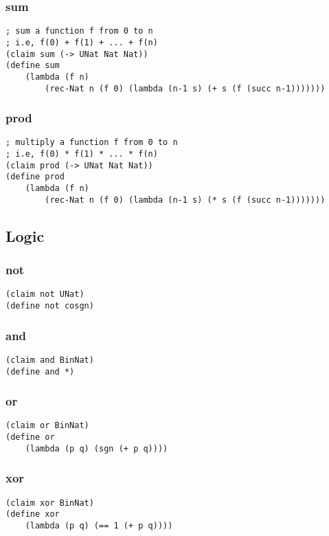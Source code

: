 \subsubsection{sum} \label{code:sum}
\begin{verbatim}
; sum a function f from 0 to n
; i.e, f(0) + f(1) + ... + f(n)
(claim sum (-> UNat Nat Nat))
(define sum
    (lambda (f n)
        (rec-Nat n (f 0) (lambda (n-1 s) (+ s (f (succ n-1)))))))
\end{verbatim}

\subsubsection{prod} \label{code:prod}
\begin{verbatim}
; multiply a function f from 0 to n
; i.e, f(0) * f(1) * ... * f(n)
(claim prod (-> UNat Nat Nat))
(define prod
    (lambda (f n)
        (rec-Nat n (f 0) (lambda (n-1 s) (* s (f (succ n-1)))))))
\end{verbatim}


\subsection{Logic}

\subsubsection{not} \label{code:not}
\begin{verbatim}
(claim not UNat)
(define not cosgn)
\end{verbatim}

\subsubsection{and} \label{code:and}
\begin{verbatim}
(claim and BinNat)
(define and *)
\end{verbatim}

\subsubsection{or} \label{code:or}
\begin{verbatim}
(claim or BinNat)
(define or
    (lambda (p q) (sgn (+ p q))))
\end{verbatim}

\subsubsection{xor} \label{code:xor}
\begin{verbatim}
(claim xor BinNat)
(define xor
    (lambda (p q) (== 1 (+ p q))))
\end{verbatim}


